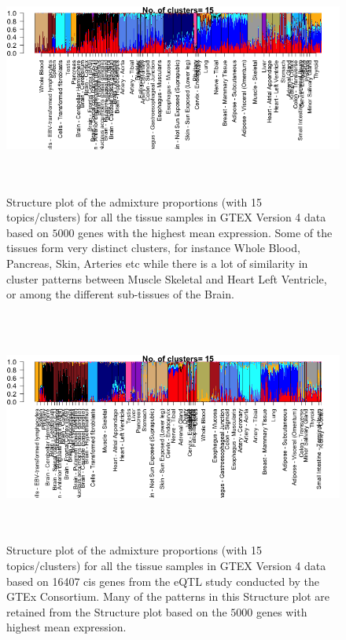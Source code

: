 
\begin{figure}[ht]
	\raggedleft
	\includegraphics[height=3in, width=6.5in]{../plots/whole_tissue_structure_15.png}
        \caption{Structure plot of the admixture proportions (with 15 topics/clusters) for all the tissue samples in GTEX Version 4 data based on $5000$ genes with the highest mean expression. Some of the tissues form very distinct clusters, for instance Whole Blood, Pancreas, Skin, Arteries etc while there is a lot of similarity in cluster patterns between Muscle Skeletal and Heart Left Ventricle, or among the different sub-tissues of the Brain.}
\end{figure}

\begin{figure}[ht]
	\raggedleft
	\includegraphics[height=3in, width=6.5in]{../plots/whole_tissue_structure_15_thinned.png}
        \caption{Structure plot of the admixture proportions (with 15 topics/clusters) for all the tissue samples in GTEX Version 4 data based on 16407 cis genes from the eQTL study conducted by the GTEx Consortium. Many of the patterns in this Structure plot are retained from the Structure plot based on the $5000$ genes with highest mean expression. }
\end{figure}

